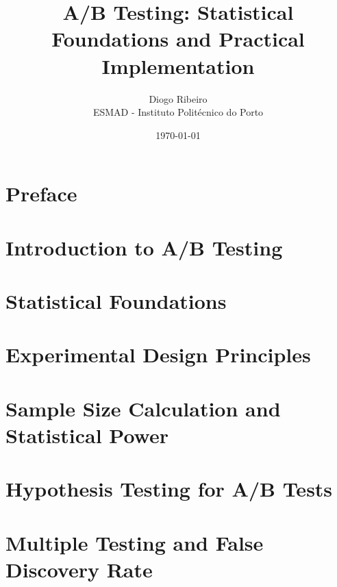 \documentclass[12pt,a4paper]{book}
\title{A/B Testing: Statistical Foundations and Practical Implementation}
\author{Diogo Ribeiro\\
        ESMAD - Instituto Politécnico do Porto}
\date{\today}
\theoremstyle{definition}
\begin{document}
\frontmatter
\maketitle

\tableofcontents
\listoffigures
\listoftables



\chapter{Preface}


\mainmatter

\chapter{Introduction to A/B Testing}


\chapter{Statistical Foundations}


\chapter{Experimental Design Principles}


\chapter{Sample Size Calculation and Statistical Power}
\label{ch:sample_size}


\chapter{Hypothesis Testing for A/B Tests}


\chapter{Multiple Testing and False Discovery Rate}
\label{ch:multiple}

\end{document}
